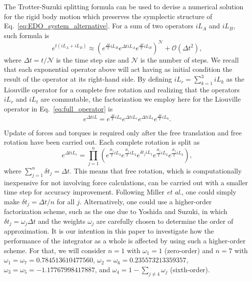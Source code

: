 \documentclass[aip,jcp,reprint,amsmath,amssymb]{revtex4-1}
\begin{document}
The Trotter-Suzuki splitting formula\cite{Trotter1959, Suzuki1976} can be used to devise a numerical solution for the rigid body motion which preserves the symplectic structure of Eq.~\ref{eq:EDO_system_alternative}. For a sum of two operators $i\!L_A$ and $i\!L_B$, such formula is
\[
e^{t(i\!L_A + i\!L_B)} \approx \left( e^{\frac{\Delta t}{2} i\!L_B} e^{\Delta t i\!L_A} e^{\frac{\Delta t}{2} i\!L_B} \right)^\mathcal{N} + \mathcal{O}(\Delta t^2),
\]
where $\Delta t = t/\mathcal N$ is the time step size and $\mathcal N$ is the number of steps. We recall that each exponential operator above will act having as initial condition the result of the operator at its right-hand side. By defining $i\!L_r = \sum_{k=1}^3 i\!L_k$ as the Liouville operator for a complete free rotation and realizing that the operators $i\!L_r$ and $i\!L_t$ are commutable, the factorization we employ here for the Liouville operator in Eq.~\ref{eq:full_operator} is
\begin{equation}
\label{eq:trotter_splitting_NVE}
e^{\Delta t i\!L} = e^{\frac{\Delta t}{2} i\!L_b} e^{\Delta t i\!L_r} e^{\Delta t i\!L_t} e^{\frac{\Delta t}{2} i\!L_b}.
\end{equation}

Update of forces and torques is required only after the free translation and free rotation have been carried out. Each complete rotation is split as\cite{Miller2002}
\begin{equation}
\label{eq:splitting_rot}
e^{\Delta t i\!L_r} = \prod_{j=1}^n \left( e^{\frac{\delta t_j}{2} i\!L_3} e^{\frac{\delta t_j}{2} i\!L_2} e^{\delta t_j i\!L_1} e^{\frac{\delta t_j}{2} i\!L_2} e^{\frac{\delta t_j}{2} i\!L_3} \right),
\end{equation}
where $\sum_{j=1}^n {\delta t}_j = \Delta t$. This means that free rotation, which is computationally inexpensive for not involving force calculations, can be carried out with a smaller time step for accuracy improvement. Following Miller \textit{et al}.,\cite{Miller2002} one could simply make $\delta t_j = \Delta t/n$ for all $j$. Alternatively, one could use a higher-order factorization scheme, such as the one due to Yoshida\cite{Yoshida1990} and Suzuki,\cite{Suzuki1991a, Suzuki1991b} in which $\delta t_j = \omega_j \Delta t$ and the weights $\omega_j$ are carefully chosen to determine the order of approximation. It is our intention in this paper to investigate how the performance of the integrator as a whole is affected by using such a higher-order scheme. For that, we will consider $n = 1$ with $\omega_1 = 1$ (zero-order) and $n = 7$ with $\omega_1 = \omega_7 = 0.784513610477560$, $\omega_2 = \omega_6 = 0.235573213359357$, $\omega_3 = \omega_5 = -1.17767998417887$, and $\omega_4 = 1 - \sum_{j \neq 4} \omega_j$ (sixth-order).
\end{document}

